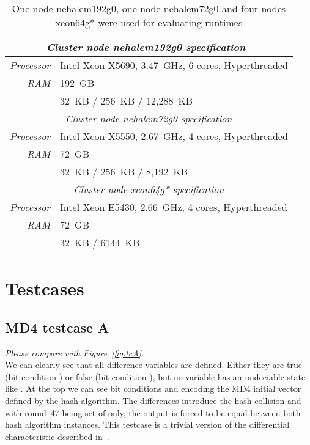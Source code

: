 \begin{appendices}
\begin{table}[!ht]
  \begin{center}
    \begin{tabular}{rl}
      \hline
        \multicolumn{2}{c}{\emph{Cluster node nehalem192g0 specification~\cite{intelX5690}}} \\
      \hline
        \emph{Processor}            & Intel Xeon X5690, 3.47~GHz, 6 cores, Hyperthreaded \\
        \emph{RAM}                  & 192~GB \\
        \emph{\caches{}}            & 32~KB / 256~KB / 12,288~KB \\
      \hline
        \multicolumn{2}{c}{\emph{Cluster node nehalem72g0 specification}} \\
      \hline
        \emph{Processor}            & Intel Xeon X5550, 2.67~GHz, 4 cores, Hyperthreaded \\
        \emph{RAM}                  & 72~GB \\
        \emph{\caches{}}            & 32~KB / 256~KB / 8,192~KB \\
      \hline
        \multicolumn{2}{c}{\emph{Cluster node xeon64g* specification}} \\
      \hline
        \emph{Processor}            & Intel Xeon E5430, 2.66~GHz, 4 cores, Hyperthreaded \\
        \emph{RAM}                  & 72~GB \\
        \emph{\caches{}}            & 32~KB / 6144~KB \\
      \hline
    \end{tabular}
    \caption{One node nehalem192g0, one node nehalem72g0 and four nodes xeon64g* were used for evaluating runtimes}
    \label{setup:cluster}
  \end{center}
\end{table}

\chapter{Testcases}
\label{app:tc}
%
\newcommand\cmp[1]{\emph{Please compare with Figure~\ref{fig:#1}.} \\ }
%
\section{MD4 testcase A}
\label{sec:tcA}
\cmp{tcA}
We can clearly see that all difference variables are defined.
Either they are true (bit condition {\dnCx}) or false (bit condition {\dnCh}),
but no variable has an undeciable state like {\dnCq}. At the top we can see
bit conditions {\dnCz} and {\dnCo} encoding the MD4 initial vector defined
by the hash algorithm. The differences {\dnCx} introduce the hash collision
and with round~47 being set of {\dnCh} only, the output is forced to be
equal between both hash algorithm instances. This testcase
is a trivial version of the differential characteristic described
in~\cite{sasaki2007new}.


\end{appendices}
